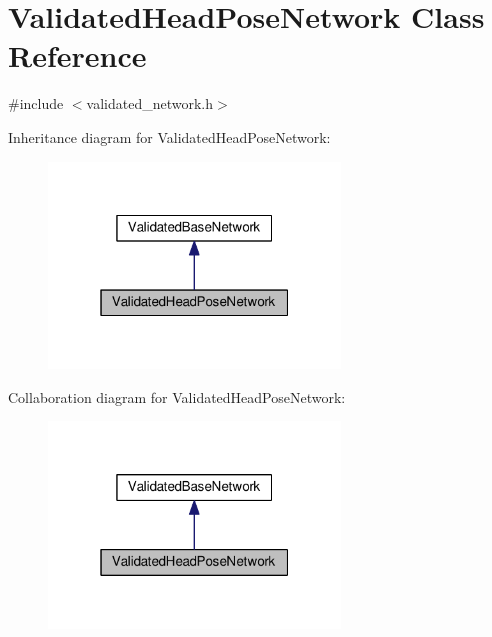 \hypertarget{classValidatedHeadPoseNetwork}{}\section{Validated\+Head\+Pose\+Network Class Reference}
\label{classValidatedHeadPoseNetwork}


{\ttfamily \#include $<$validated\+\_\+network.\+h$>$}



Inheritance diagram for Validated\+Head\+Pose\+Network\+:
\nopagebreak
\begin{figure}[H]
\begin{center}
\leavevmode
\includegraphics[width=220pt]{classValidatedHeadPoseNetwork__inherit__graph}
\end{center}
\end{figure}


Collaboration diagram for Validated\+Head\+Pose\+Network\+:
\nopagebreak
\begin{figure}[H]
\begin{center}
\leavevmode
\includegraphics[width=220pt]{classValidatedHeadPoseNetwork__coll__graph}
\end{center}
\end{figure}
